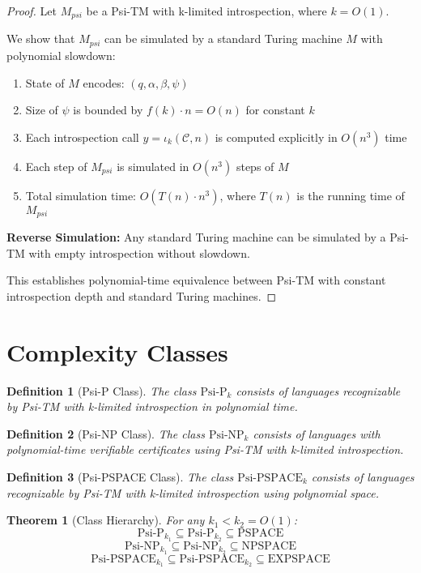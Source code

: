 \documentclass[11pt]{article}
\newtheorem{definition}{Definition}
\newtheorem{theorem}{Theorem}
\begin{document}
\begin{proof}
Let $M_{psi}$ be a Psi-TM with k-limited introspection, where $k = O(1)$.

We show that $M_{psi}$ can be simulated by a standard Turing machine $M$ with polynomial slowdown:

\begin{enumerate}
\item State of $M$ encodes: $(q, \alpha, \beta, \psi)$
\item Size of $\psi$ is bounded by $f(k) \cdot n = O(n)$ for constant $k$
\item Each introspection call $y=\iota_k(\mathcal{C},n)$ is computed explicitly in $O(n^3)$ time
\item Each step of $M_{psi}$ is simulated in $O(n^3)$ steps of $M$
\item Total simulation time: $O(T(n) \cdot n^3)$, where $T(n)$ is the running time of $M_{psi}$
\end{enumerate}

\textbf{Reverse Simulation:}
Any standard Turing machine can be simulated by a Psi-TM with empty introspection without slowdown.

This establishes polynomial-time equivalence between Psi-TM with constant introspection depth and standard Turing machines.
\end{proof}

\section{Complexity Classes}

\begin{definition}[Psi-P Class]
The class $\text{Psi-P}_k$ consists of languages recognizable by Psi-TM with k-limited introspection in polynomial time.
\end{definition}

\begin{definition}[Psi-NP Class]
The class $\text{Psi-NP}_k$ consists of languages with polynomial-time verifiable certificates using Psi-TM with k-limited introspection.
\end{definition}

\begin{definition}[Psi-PSPACE Class]
The class $\text{Psi-PSPACE}_k$ consists of languages recognizable by Psi-TM with k-limited introspection using polynomial space.
\end{definition}

\begin{theorem}[Class Hierarchy]
For any $k_1 < k_2 = O(1)$:
$$\text{Psi-P}_{k_1} \subseteq \text{Psi-P}_{k_2} \subseteq \text{PSPACE}$$
$$\text{Psi-NP}_{k_1} \subseteq \text{Psi-NP}_{k_2} \subseteq \text{NPSPACE}$$
$$\text{Psi-PSPACE}_{k_1} \subseteq \text{Psi-PSPACE}_{k_2} \subseteq \text{EXPSPACE}$$
\end{theorem}
\end{document}
